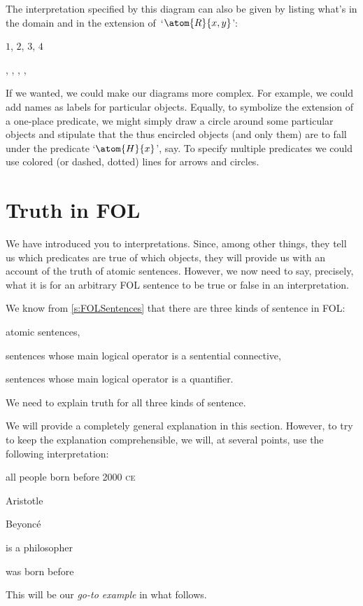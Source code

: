 The interpretation specified by this diagram can also be given by listing what's in the domain and in the extension of~`$\atom{R}{x,y}$':
	\begin{ekey}
	\item[\text{domain}] $1$, $2$, $3$, $4$
	\item[R(x,y)] , 
		, 
		, 
		,
	\end{ekey}
If we wanted, we could make our diagrams more complex. For example, we could add names as labels for particular objects. Equally, to symbolize the extension of a one-place predicate, we might simply draw a circle around some particular objects and stipulate that the thus encircled objects (and only them) are to fall under the predicate `$\atom{H}{x}$', say. To specify multiple predicates we could use colored (or dashed, dotted) lines for arrows and circles.


\chapter{Truth in FOL}\label{s:TruthFOL}
We have introduced you to interpretations. Since, among other things, they tell us which predicates are true of which objects, they will provide us with an account of the truth of atomic sentences. However, we now need to say, precisely, what it is for an arbitrary FOL sentence to be true or false in an interpretation.

We know from \cref{s:FOLSentences} that there are three kinds of sentence in FOL: 
	\begin{compactlist}
		\item atomic sentences,
		\item sentences whose main logical operator is a sentential connective,
		\item sentences whose main logical operator is a quantifier.
	\end{compactlist}
We need to explain truth for all three kinds of sentence.

We will provide a completely general explanation in this section. However, to try to keep the explanation comprehensible, we will, at several points, use the following interpretation:
	\begin{ekey}
		\item[\text{domain}] all people born before 2000 \textsc{ce}
		\item[a] Aristotle
		\item[b] Beyonc\'e
		\item[\atom{P}{x}]  is a philosopher
		\item[\atom{R}{x,y}]  was born before \gap{y}
	\end{ekey}
This will be our \emph{go-to example} in what follows.

